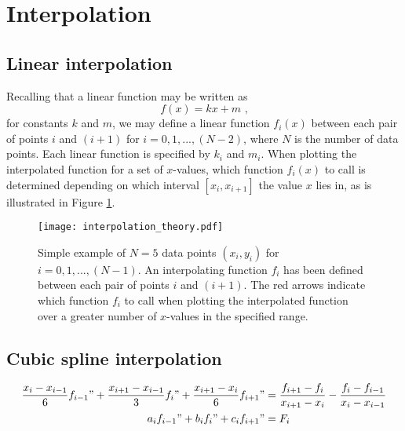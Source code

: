 \documentclass[paper=a4, fontsize=11pt]{scrartcl}
\begin{document}
\section{Interpolation}
\subsection{Linear interpolation}
Recalling that a linear function may be written as 
\begin{equation}
f(x) = kx + m \text{ ,}
\end{equation}
for constants $k$ and $m$, we may define a linear function $f_{i}(x)$ between each pair of points $i$ and $(i+1)$ for $i = 0, 1, ... , (N-2)$, where $N$ is the number of data points. Each linear function is specified by $k_{i}$ and $m_{i}$. When plotting the interpolated function for a set of $x$-values, which function $f_{i}(x)$ to call is determined depending on which interval $[x_{i}, x_{i+1}]$ the value $x$ lies in, as is illustrated in Figure \ref{interpolation theory}. 
\begin{figure}
	\centering
	\texttt{[image: interpolation\_theory.pdf]}
	\caption{\footnotesize{Simple example of $N=5$ data points $(x_{i}, y_{i})$ for $i = 0, 1, ... , (N-1)$. An interpolating function $f_{i}$ has been defined between each pair of points $i$ and $(i+1)$. The red arrows indicate which function $f_{i}$ to call when plotting the interpolated function over a greater number of $x$-values in the specified range.}}
	\label{interpolation theory}
\end{figure}

\subsection{Cubic spline interpolation}

\begin{align}
\label{cubic}
	\begin{split}
	\frac{x_{i}-x_{i-1}}{6} f_{i-1}" + \frac{x_{i+1}-x_{i-1}}{3} f_{i}" + 	\frac{x_{i+1}-x_{i}}{6} f_{i+1}"  &= \frac{f_{i+1}-f_{i}}{ x_{i+1}-x_{i} } - \frac{f_{i}-f_{i-1}}{ x_{i}-x_{i-1} } \\
	a_{i} f_{i-1}" + b_{i} f_{i}" + c_{i} f_{i+1}" &= F_{i}
	\end{split}
\end{align}
\end{document}
